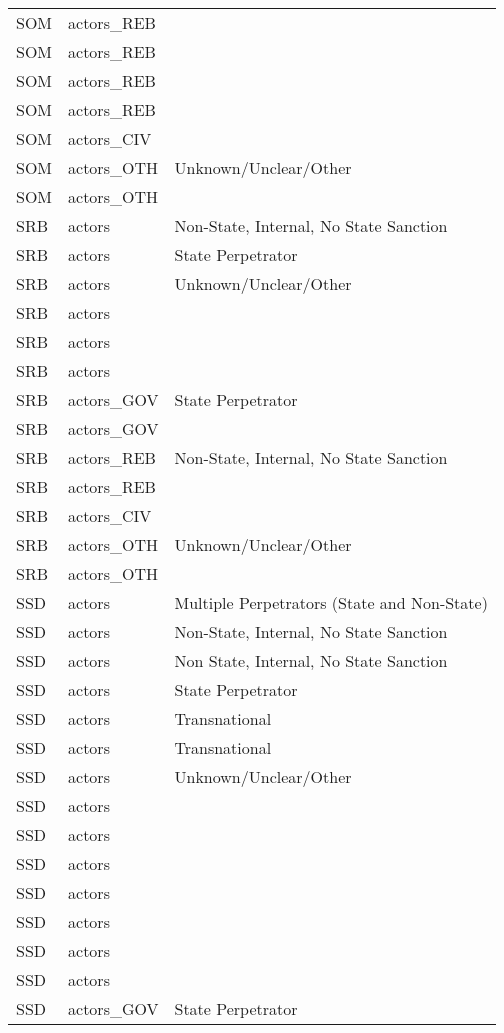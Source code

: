 \begin{table}[ht]
\begin{tabular}{lll}
  SOM & actors\_REB &  \\ 
  SOM & actors\_REB &  \\ 
  SOM & actors\_REB &  \\ 
  SOM & actors\_REB &  \\ 
  SOM & actors\_CIV &  \\ 
  SOM & actors\_OTH & Unknown/Unclear/Other \\ 
  SOM & actors\_OTH &  \\ 
  SRB & actors & Non-State, Internal, No State Sanction \\ 
  SRB & actors & State Perpetrator \\ 
  SRB & actors & Unknown/Unclear/Other \\ 
  SRB & actors &  \\ 
  SRB & actors &  \\ 
  SRB & actors &  \\ 
  SRB & actors\_GOV & State Perpetrator \\ 
  SRB & actors\_GOV &  \\ 
  SRB & actors\_REB & Non-State, Internal, No State Sanction \\ 
  SRB & actors\_REB &  \\ 
  SRB & actors\_CIV &  \\ 
  SRB & actors\_OTH & Unknown/Unclear/Other \\ 
  SRB & actors\_OTH &  \\ 
  SSD & actors & Multiple Perpetrators (State and Non-State) \\ 
  SSD & actors & Non-State, Internal, No State Sanction \\ 
  SSD & actors & Non State, Internal, No State Sanction \\ 
  SSD & actors & State Perpetrator \\ 
  SSD & actors & Transnational \\ 
  SSD & actors & Transnational \\ 
  SSD & actors & Unknown/Unclear/Other \\ 
  SSD & actors &  \\ 
  SSD & actors &  \\ 
  SSD & actors &  \\ 
  SSD & actors &  \\ 
  SSD & actors &  \\ 
  SSD & actors &  \\ 
  SSD & actors &  \\ 
  SSD & actors\_GOV & State Perpetrator \\ 

\end{tabular}
\end{table}
